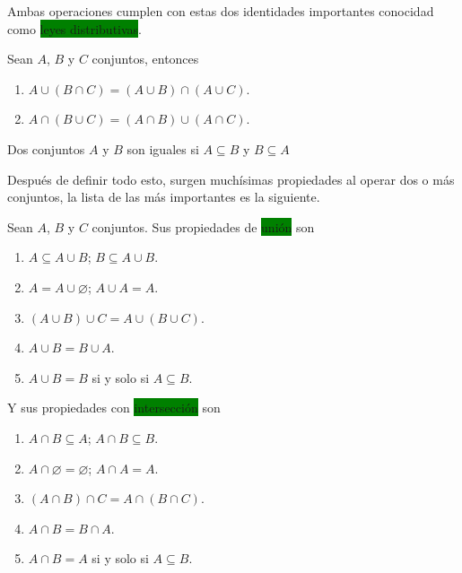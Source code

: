 \documentclass[11pt]{article}
\begin{document}
Ambas operaciones cumplen con estas dos identidades importantes conocidad como \colorbox{Green}{leyes distributivas}.

Sean $A$, $B$ y $C$ conjuntos, entonces

\begin{enumerate}
    \item $A \cup (B \cap C) = (A \cup B) \cap (A \cup C)$.

    \item $A \cap (B \cup C) = (A \cap B) \cup (A \cap C)$.
\end{enumerate}


Dos conjuntos $A$ y $B$ son iguales si $A\subseteq B$ y $B \subseteq A$ 

Después de definir todo esto, surgen muchísimas propiedades al operar dos o más conjuntos, la lista de las más importantes es la siguiente.

Sean $A$, $B$ y $C$ conjuntos. Sus propiedades de \colorbox{Green}{unión} son

\begin{enumerate}
    \item $A \subseteq A \cup B$; $B \subseteq A \cup B$.

    \item $A = A \cup \varnothing$; $A \cup A = A$.

    \item $(A \cup B) \cup C = A \cup (B \cup C)$.

    \item $A \cup B = B \cup A$.

    \item $A \cup B = B$ si y solo si $A \subseteq B$.
\end{enumerate}

Y sus propiedades con \colorbox{Green}{intersección} son

\begin{enumerate}
    \item $A \cap B \subseteq A$; $A \cap B \subseteq B$.

    \item $A \cap \varnothing = \varnothing$; $A \cap A = A$.

    \item $(A \cap B) \cap C = A \cap (B \cap C)$.

    \item $A \cap B = B \cap A$.

    \item $A \cap B = A$ si y solo si $A \subseteq B$.
\end{enumerate}
\end{document}
